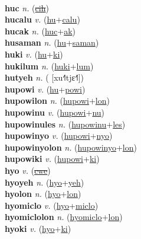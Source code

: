  \label{'humuhumunukunukuapua} \\
\textbf{huc} \textit{n.} (\hyperref[cih]{\sout{cih}})
 \label{huc} \\
\textbf{hucalu} \textit{v.} (\hyperref[hu]{hu}+\hyperref[calu]{calu})
 \label{hucalu} \\
\textbf{hucak} \textit{n.} (\hyperref[huc]{huc}+\hyperref[ak]{ak})
 \label{hucak} \\
\textbf{husaman} \textit{n.} (\hyperref[hu]{hu}+\hyperref[saman]{saman})
 \label{husaman} \\
\textbf{huki} \textit{v.} (\hyperref[hu]{hu}+\hyperref[ki]{ki})
 \label{huki} \\
\textbf{hukilum} \textit{n.} (\hyperref[huki]{huki}+\hyperref[lum]{lum})
 \label{hukilum} \\
\textbf{hutyeh} \textit{n.} ( [xu˧˥tjɛ˧˥])
 \label{hutyeh} \\
\textbf{hupowi} \textit{v.} (\hyperref[hu]{hu}+\hyperref[powi]{powi})
 \label{hupowi} \\
\textbf{hupowilon} \textit{n.} (\hyperref[hupowi]{hupowi}+\hyperref[lon]{lon})
 \label{hupowilon} \\
\textbf{hupowinu} \textit{v.} (\hyperref[hupowi]{hupowi}+\hyperref[nu]{nu})
 \label{hupowinu} \\
\textbf{hupowinules} \textit{n.} (\hyperref[hupowinu]{hupowinu}+\hyperref[les]{les})
 \label{hupowinules} \\
\textbf{hupowinyo} \textit{v.} (\hyperref[hupowi]{hupowi}+\hyperref[nyo]{nyo})
 \label{hupowinyo} \\
\textbf{hupowinyolon} \textit{n.} (\hyperref[hupowinyo]{hupowinyo}+\hyperref[lon]{lon})
 \label{hupowinyolon} \\
\textbf{hupowiki} \textit{v.} (\hyperref[hupowi]{hupowi}+\hyperref[ki]{ki})
 \label{hupowiki} \\
\textbf{hyo} \textit{v.} (\hyperref[cwe]{\sout{cwe}})
 \label{hyo} \\
\textbf{hyoyeh} \textit{n.} (\hyperref[hyo]{hyo}+\hyperref[yeh]{yeh})
 \label{hyoyeh} \\
\textbf{hyolon} \textit{n.} (\hyperref[hyo]{hyo}+\hyperref[lon]{lon})
 \label{hyolon} \\
\textbf{hyomiclo} \textit{v.} (\hyperref[hyo]{hyo}+\hyperref[miclo]{miclo})
 \label{hyomiclo} \\
\textbf{hyomiclolon} \textit{n.} (\hyperref[hyomiclo]{hyomiclo}+\hyperref[lon]{lon})
 \label{hyomiclolon} \\
\textbf{hyoki} \textit{v.} (\hyperref[hyo]{hyo}+\hyperref[ki]{ki})
